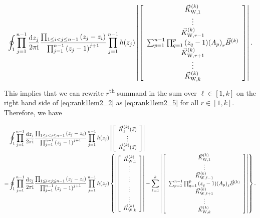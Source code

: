 \documentclass[cmp]{svjour}
\numberwithin{theorem}{section}
\numberwithin{equation}{section}
\def\dd{{\rm d}}
\def\ii{{\rm i}}
\begin{document}
\begin{equation}
\label{eq:rank1lem2_5}
\begin{split}
 \oint_{1} \prod_{j=1}^{n-1}{ \frac{\dd z_j}{2 \pi \ii} } \frac{ \prod_{1 \leq i < j \leq n-1}{(z_j - z_i)} }{ \prod_{j=1}^{n-1}{{(z_j -1)}^{j+1}} } \prod_{j=1}^{n-1}{h(z_j)}
 \left| 
 \left[
\begin{array}{c}
\vec{K}^{(k)}_{\mathrm{W}, 1} \\
\vdots  \\
\vec{K}^{(k)}_{\mathrm{W}, r -1} \\
\sum_{p=1}^{n-1}{ \prod_{q=1}^{p}{ (z_q - 1) {(A_p)}_r } } \vec{B}^{(k)} \\
\vec{K}^{(k)}_{\mathrm{W}, r +1} \\
\vdots \\
\vec{K}^{(k)}_{\mathrm{W}, k}
\end{array}
\right]
\right| .
\end{split}
\end{equation}
This implies that we can rewrite $r$\textsuperscript{th} summand in the sum over $\ell \in [1,k]$ on the right hand side of \eqref{eq:rank1lem2_2} as \eqref{eq:rank1lem2_5} for all $r \in [1,k]$.
Therefore, we have

\begin{equation}
\label{eq:rank1lem2_6}
\begin{split}
& \oint_{1} \prod_{j=1}^{n-1}{ \frac{\dd z_j}{2 \pi \ii} } \frac{ \prod_{1 \leq i < j \leq n-1}{(z_j - z_i)} }{ \prod_{j=1}^{n-1}{{(z_j -1)}^{j+1}} } \prod_{j=1}^{n-1}{h(z_j)} 
\left|
\left[
\begin{array}{c}
\vec{K}^{(k)}_{1}(\vec{z}) \\
\vdots \\
\vec{K}^{(k)}_{k}(\vec{z}) 
\end{array}
\right]
\right| \\
= & \oint_{1} \prod_{j=1}^{n-1}{ \frac{\dd z_j}{2 \pi \ii} } \frac{ \prod_{1 \leq i < j \leq n-1}{(z_j - z_i)} }{ \prod_{j=1}^{n-1}{{(z_j -1)}^{j+1}} } \prod_{j=1}^{n-1}{h(z_j)} 
\left\{
\left|
\left[
\begin{array}{c}
\vec{K}^{(k)}_{\mathrm{W}, 1} \\
\vdots \\
\vdots \\
\vdots \\
\vdots \\
\vec{K}^{(k)}_{\mathrm{W}, k} 
\end{array}
\right]
\right| - \sum_{\ell=1}^{k}{ \left| \left[
\begin{array}{c}
\vec{K}^{(k)}_{\mathrm{W}, 1}  \\
\vdots \\
\vec{K}^{(k)}_{\mathrm{W}, \ell-1}  \\
\sum_{p=1}^{n-1}{ \prod_{q=1}^{p}{ (z_q - 1) {(A_p)}_\ell } } \vec{B}^{(k)} \\
 \vec{K}^{(k)}_{\mathrm{W}, \ell+1}  \\
 \vdots  \\
\vec{K}^{(k)}_{\mathrm{W}, k} 
\end{array}
\right]
\right| }
 \right\} .
\end{split}
\end{equation}
\end{document}
